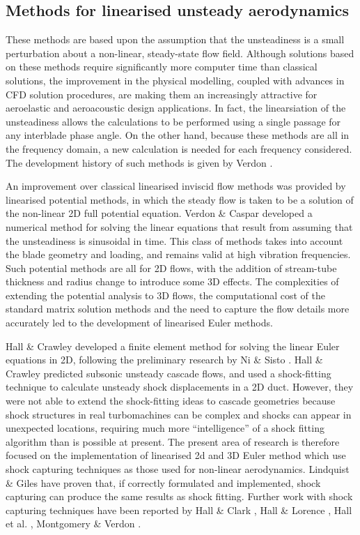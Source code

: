 \subsection{Methods for linearised unsteady aerodynamics}
\label{linear_methods.subsec}
%
 These methods are based upon the assumption that the unsteadiness
 is a small perturbation about a non-linear, steady-state flow field.
 Although solutions based on these methods require significantly more
 computer time than classical solutions, the improvement in the physical modelling,
 coupled with advances in CFD solution procedures,
 are making them an increasingly attractive for aeroelastic
 and aeroacoustic design applications.
 In fact, the linearsiation of the unsteadiness
 allows the calculations to be performed using a single passage
 for any interblade phase angle.
 On the other hand, because these methods
 are all in the frequency domain, a new calculation is needed
 for each frequency considered.
 The development history of such methods is given by Verdon \citeyear{Verdon:5,Verdon:2}.

 An improvement over classical linearised inviscid flow methods was provided
 by linearised potential methods, in which the steady flow is taken to be a solution
 of the non-linear 2D full potential equation. Verdon \& Caspar
 \citeyear{Verdon:1} developed a numerical method for solving
 the linear equations that result from assuming that the unsteadiness
 is sinusoidal in time. This class of methods takes into account the blade geometry
 and loading, and remains valid at high vibration frequencies.
 Such potential methods are all for 2D flows, with the addition of
 stream-tube thickness and radius change to introduce some 3D effects.
 The complexities of extending the potential analysis to 3D flows,
 the computational cost of the standard matrix solution methods
 and the need to capture the flow details more accurately led to
 the development of linearised Euler methods.

 Hall \& Crawley \citeyear{Hall:1} developed a finite element method for
 solving the linear Euler equations in 2D, following the
 preliminary research by Ni \& Sisto \citeyear{Ni:1}.
 Hall \& Crawley \citeyear{Hall:1} predicted subsonic
 unsteady cascade flows, and used a shock-fitting technique to calculate
 unsteady shock displacements in a 2D duct.
 However, they were not able to extend the
 shock-fitting ideas to cascade geometries because shock structures
 in real turbomachines can be complex and shocks can appear
 in  unexpected locations, requiring much more ``intelligence'' of a shock fitting
 algorithm than is possible at present.
 The present area of research is therefore focused on the implementation
 of linearised 2d and 3D Euler method which use shock capturing techniques
 as those used for non-linear aerodynamics.
 Lindquist \& Giles \citeyear{Giles:1} have proven that, if correctly formulated
 and implemented, shock capturing can produce the same results as shock fitting.
 Further work with shock capturing
 techniques have been reported by Hall \& Clark \citeyear{Hall:6},
 Hall \& Lorence \citeyear{Hall:2},
 Hall et al. \citeyear{Hall:3}, Montgomery \& Verdon \citeyear{Verdon:3,Verdon:4}.

